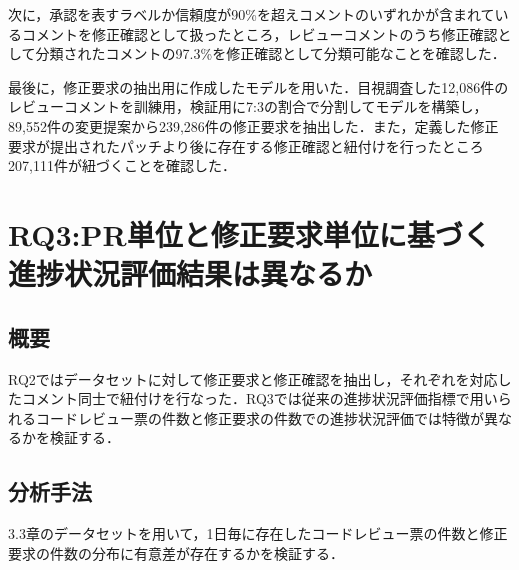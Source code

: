 \documentclass[T,J]{fose} %
\newcommand{\RQThree}{PR単位と修正要求単位に基づく進捗状況評価結果は異なるか}
\begin{document}
次に，承認を表すラベルか信頼度が90\%を超えコメントのいずれかが含まれているコメントを修正確認として扱ったところ，レビューコメントのうち修正確認として分類されたコメントの97.3\%を修正確認として分類可能なことを確認した．

最後に，修正要求の抽出用に作成したモデルを用いた．目視調査した12,086件のレビューコメントを訓練用，検証用に7:3の割合で分割してモデルを構築し，89,552件の変更提案から239,286件の修正要求を抽出した．また，定義した修正要求が提出されたパッチより後に存在する修正確認と紐付けを行ったところ207,111件が紐づくことを確認した．

\section{RQ3:\RQThree}\label{sec:RQ3}

\subsection{概要}
RQ2ではデータセットに対して修正要求と修正確認を抽出し，それぞれを対応したコメント同士で紐付けを行なった．RQ3では従来の進捗状況評価指標で用いられるコードレビュー票の件数と修正要求の件数での進捗状況評価では特徴が異なるかを検証する．

\subsection{分析手法}
3.3章のデータセットを用いて，1日毎に存在したコードレビュー票の件数と修正要求の件数の分布に有意差が存在するかを検証する．




\end{document}
